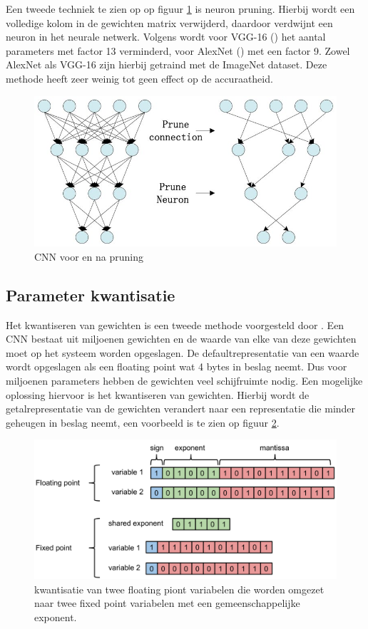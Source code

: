 Een tweede techniek te zien op op figuur \ref{fig:pruning} is neuron pruning.
Hierbij wordt een volledige kolom in de gewichten matrix verwijderd, daardoor verdwijnt een neuron in het neurale netwerk. 
Volgens \cite{han_deep_2016} wordt voor VGG-16 (\cite{simonyan2015deep}) het aantal parameters met factor 13 verminderd, voor AlexNet (\cite{Krizhevsky_act_2017}) met een factor 9.
Zowel AlexNet als VGG-16 zijn hierbij getraind met de ImageNet dataset.
Deze methode heeft zeer weinig tot geen effect op de accuraatheid.

\begin{figure}[!ht]
	\centering
	\includegraphics[width=0.65\linewidth]{fig/pruning.jpg}
	\caption{CNN voor en na pruning}
	\label{fig:pruning}
\end{figure}

\subsection{Parameter kwantisatie}
Het kwantiseren van gewichten is een tweede methode voorgesteld door \cite{han_deep_2016}.
Een CNN bestaat uit miljoenen gewichten en de waarde van elke van deze gewichten moet op het systeem worden opgeslagen.
De defaultrepresentatie van een waarde wordt opgeslagen als een floating point wat 4 bytes in beslag neemt.
Dus voor miljoenen parameters hebben de gewichten veel schijfruimte nodig.
Een mogelijke oplossing hiervoor is het kwantiseren van gewichten.
Hierbij wordt de getalrepresentatie van de gewichten verandert naar een representatie die minder geheugen in beslag neemt, een voorbeeld is te zien op figuur \ref{fig:kwantizatie}.

\begin{figure}[!ht]
	\centering
	\includegraphics[width=0.7\linewidth]{fig/kwantization.png}
	\caption{kwantisatie van twee floating piont variabelen die worden omgezet naar twee fixed point variabelen met een gemeenschappelijke exponent.}
	\label{fig:kwantizatie}
\end{figure}

